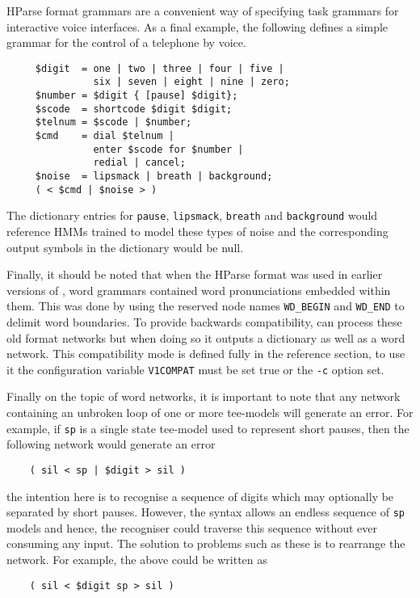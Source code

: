 HParse format grammars are a convenient way of specifying 
task grammars for interactive voice interfaces.  As a final
example, the following defines a simple grammar for the control
of a telephone by voice.
\begin{verbatim}
     $digit  = one | two | three | four | five |
               six | seven | eight | nine | zero;
     $number = $digit { [pause] $digit};
     $scode  = shortcode $digit $digit;
     $telnum = $scode | $number;
     $cmd    = dial $telnum | 
               enter $scode for $number |
               redial | cancel;
     $noise  = lipsmack | breath | background;
     ( < $cmd | $noise > )
\end{verbatim}
The dictionary entries for \texttt{pause}, \texttt{lipsmack}, 
\texttt{breath} and \texttt{background} would reference HMMs trained
to model these types of noise and the corresponding output symbols
in the dictionary would be null.

Finally, it should be noted that when the HParse 
format was used in
earlier versions of \HTK, word grammars contained word pronunciations
embedded within them.  This was done by using the reserved node names
\texttt{WD\_BEGIN} and \texttt{WD\_END} to delimit word boundaries. To
provide backwards compatibility,  can process these old
format networks but when doing so it outputs a dictionary as well as a
word network.  This compatibility mode is defined fully in the
reference section, to use it the configuration variable
\texttt{V1COMPAT} must be set 
true or the \texttt{-c} option set.

Finally on the topic of word 
networks, it is important to note that
any network containing an unbroken loop of one or more tee-models
will generate an error.  
For example, if \texttt{sp} is a single state tee-model used to 
represent short pauses, then the following network would generate an
error
\begin{verbatim}
    ( sil < sp | $digit > sil )
\end{verbatim}
the intention here is to recognise a sequence of digits which may
optionally be separated by short pauses.  However, the syntax allows
an endless sequence of \texttt{sp} models and hence, the recogniser could
traverse this sequence without ever consuming any input.  The solution to
problems such as these is to rearrange the network.  For example, the
above could be written as
\begin{verbatim}
    ( sil < $digit sp > sil )
\end{verbatim}

